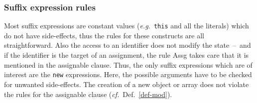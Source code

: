 \documentclass[a4paper]{llncs}
\newcommand{\java}{\textsc{Java}}
\begin{document}
\subsubsection{Suffix expression rules}
Most suffix expressions are constant values (\emph{e.g.}~\texttt{this}
and all the literals) which do not have side-effects, thus the rules
for these constructs are all straightforward. Also the access to an
identifier does not modify the state~--~and if the identifier is the
target of an assignment, the rule \textsf{Assg} takes care that it is
mentioned in the assignable clause. Thus, the only suffix expressions
which are of interest are the \texttt{new} expressions. Here, the
possible arguments have to be checked for unwanted side-effects. The
creation of a new object or array does not violate the rules for the
assignable clause (\emph{cf.}~Def.~\ref{def-mod}).

\end{document}
